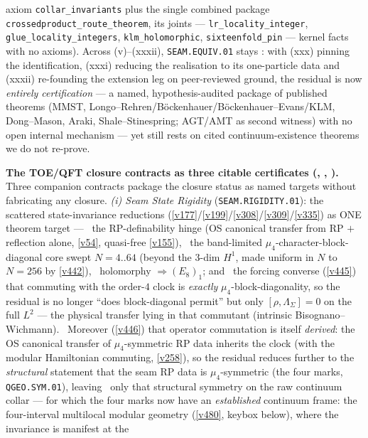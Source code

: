 \documentclass[11pt,a4paper]{article}
\begin{document}
\begin{keybox}
axiom \texttt{collar\_invariants} plus the single combined package \texttt{crossedproduct\_route\_theorem}, its
joints --- \texttt{lr\_locality\_integer}, \texttt{glue\_locality\_integers}, \texttt{klm\_holomorphic},
\texttt{sixteenfold\_pin} --- kernel facts with no axioms). Across
(v)--(xxxii), \texttt{SEAM.EQUIV.01}
stays \mO: with (xxx) pinning the identification, (xxxi) reducing the realisation to its one-particle data and
(xxxii) re-founding the extension leg on peer-reviewed ground, the
residual is now \emph{entirely certification} --- a named, hypothesis-audited package of published theorems (MMST,
Longo--Rehren/B\"ockenhauer/B\"ockenhauer--Evans/KLM, Dong--Mason, Araki, Shale--Stinespring; AGT/AMT as second
witness) with no open internal mechanism --- yet still rests on cited
continuum-existence theorems we do not re-prove.
\par\smallskip\noindent\textbf{The TOE/QFT closure contracts as three citable certificates
(, , ).}
Three companion contracts package the closure status as named targets without fabricating any closure.
\emph{(i) Seam State Rigidity} (\texttt{SEAM.RIGIDITY.01}): the scattered state-invariance reductions
(\vref{v177}/\vref{v199}/\vref{v308}/\vref{v309}/\vref{v335}) as ONE theorem target --- \mE\ the RP-definability
hinge (OS canonical transfer from RP $+$ reflection alone, \vref{v54}, quasi-free \vref{v155}), \mE\ the band-limited
$\mu_4$-character-block-diagonal core swept $N{=}4..64$ (beyond the $3$-dim $H^1$, made uniform in $N$ to $N{=}256$
by \vref{v442}), \mE\ holomorphy $\Rightarrow(E_8)_1$; and \mE\ the forcing converse (\vref{v445}) that commuting with
the order-$4$ clock is \emph{exactly} $\mu_4$-block-diagonality, so the residual is no longer ``does block-diagonal
permit'' but only $[\rho,\Lambda_\Sigma]{=}0$ on the full $L^2$ --- the physical transfer lying in that
commutant (intrinsic Bisognano--Wichmann). \mE\ Moreover (\vref{v446}) that operator commutation is itself
\emph{derived}: the OS canonical transfer of $\mu_4$-symmetric RP data inherits the clock (with the modular
Hamiltonian commuting, \vref{v258}), so the residual reduces further to the \emph{structural} statement that the
seam RP data is $\mu_4$-symmetric (the four marks, \texttt{QGEO.SYM.01}), leaving \mO\ only that structural
symmetry on the raw continuum collar --- for which the four marks now have an \emph{established} continuum frame:
the four-interval multilocal modular geometry (\vref{v480}, keybox below), where the invariance is manifest at the

\end{keybox}
\end{document}
